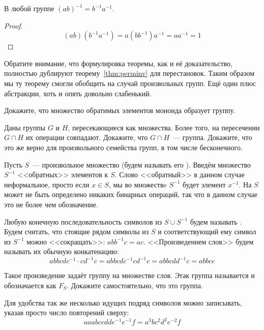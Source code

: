 \begin{thm}
	В любой группе $(ab)^{-1}=b^{-1}a^{-1}$.
\end{thm}
\begin{proof}
	\[
	(ab)(b^{-1}a^{-1}) = a(bb^{-1})a^{-1} = aa^{-1} = 1
	\]
\end{proof}

Обратите внимание, что формулировка теоремы, как и её доказательство, полностью дублируют теорему~\ref{thm:perminv} для перестановок. Таким образом мы ту теорему смогли обобщить на случай произвольных групп. Ещё один плюс абстракции, хоть и опять довольно слабенький.

\begin{exercise}
	Докажите, что множество обратимых элементов моноида образует группу.
\end{exercise}

\begin{exercise}\label{ex:grpint}
Даны группы $G$ и $H$, пересекающиеся как множества. Более того, на пересечении $G\cap H$ их операции совпадают. Докажите, что $G\cap H$~--- группа. Докажите, что это же верно для произвольного семейства групп, в том числе бесконечного.
\end{exercise}

\begin{example}
	Пусть $S$~--- произвольное множество (будем называть его ). Введём множество $S^{-1}$ <<обратных>> элементов к $S$. Слово <<обратный>> в данном случае неформальное, просто если $x\in S$, мы во множествe $S^{-1}$ будет элемент $x^{-1}$. На $S$ может не быть определено никаких бинарных операций, так что в данном случае это не более чем обозначение.
	
	Любую конечную последовательность символов из $S\cup S^{-1}$ будем называть . Будем считать, что стоящие рядом символы из $S$ и соответствующий ему символ из $S^{-1}$ можно <<сокращать>>: $abb^{-1}c = ac$. <<Произведением слов>> будем называть их обычную конкатенацию:
	\[
	abbcdc^{-1} \cdot cd^{-1}c = abbcdc^{-1}cd^{-1}c = abbcdd^{-1}c = abbcc
	\]
	
	Такое произведение задаёт группу на множестве слов. Этак группа называется  и обозначается как $F_S$. Докажите самостоятельно, что это группа.
\end{example}

Для удобства так же несколько идущих подряд символов можно записывать, указав просто число повторений сверху:
\[
aaabccdde^{-1}e^{-1}f = a^3 b c^2 d^2 e^{-2} f
\]

